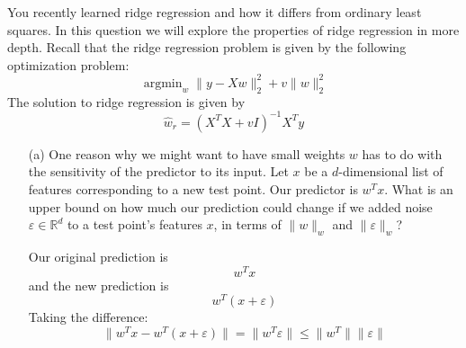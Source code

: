 \documentclass{article}
\begin{document}
You recently learned ridge regression and how it differs from ordinary least squares. In this question we will explore the properties of ridge regression in more depth. Recall that the ridge regression problem is given by the following optimization problem:
    \begin{equation*}
        \mathop{argmin}_{w} \lVert y - Xw \rVert^{2}_{2} + v \lVert w \rVert^{2}_{2}
    \end{equation*}
The solution to ridge regression is given by 
    \begin{equation*}
        \hat{w}_{r} = (X^{T}X + vI)^{-1}X^{T}y
    \end{equation*}
    \begin{itemize}
        \item [(a)] One reason why we might want to have small weights $w$ has to do with the sensitivity of the predictor to its input. Let $x$ be a $d$-dimensional list of features corresponding to a new test point. Our predictor is $w^{T}x$. What is an upper bound on how much our prediction could change if we added noise $\varepsilon \in \mathbb{R}^{d}$ to a test point's features $x$, in terms of $\lVert w \rVert_{w}$ and $\lVert \varepsilon \rVert_{w}$?
            \begin{answer}
                Our original prediction is
                    \begin{equation*}
                        w^{T}x
                    \end{equation*}
                and the new prediction is
                    \begin{equation*}
                        w^{T}(x + \varepsilon)
                    \end{equation*}
                Taking the difference:
                    \begin{equation*}
                        \lVert w^{T}x - w^{T}(x + \varepsilon) \rVert = \lVert w^{T}\varepsilon \rVert \leq \lVert w^{T} \rVert \lVert \varepsilon \rVert
                    \end{equation*}
            \end{answer}


\end{itemize}
\end{document}
